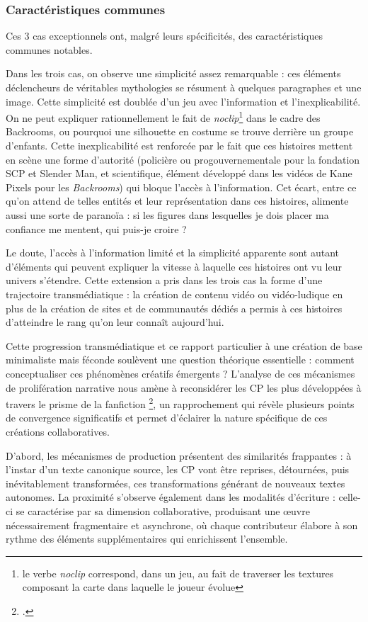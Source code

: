 \documentclass[12pt,a4paper,oneside,titlepage]{book} %
\begin{document}
\subsubsection{Caractéristiques communes}
 Ces 3 cas exceptionnels ont, malgré leurs spécificités, des caractéristiques communes notables. 
 
 Dans les trois cas, on observe une simplicité assez remarquable : ces éléments déclencheurs de véritables mythologies se résument à quelques paragraphes et une image. Cette simplicité est doublée d'un jeu avec l'information et l'inexplicabilité. On ne peut expliquer rationnellement le fait de \textit{noclip}\footnote{le verbe \textit{noclip} correspond, dans un jeu, au fait de traverser les textures composant la carte dans laquelle le joueur évolue} dans le cadre des Backrooms, ou pourquoi une silhouette en costume se trouve derrière un groupe d'enfants. 
 Cette inexplicabilité est renforcée par le fait que ces histoires mettent en scène une forme d'autorité (policière ou progouvernementale pour la fondation SCP et Slender Man, et scientifique, élément développé dans les vidéos de Kane Pixels pour les \textit{Backrooms}) qui bloque l'accès à l'information. Cet écart, entre ce qu'on attend de telles entités et leur représentation dans ces histoires, alimente aussi une sorte de paranoïa : si les figures dans lesquelles je dois placer ma confiance me mentent, qui puis-je croire ? 

Le doute, l'accès à l'information limité et la simplicité apparente sont autant d’éléments qui peuvent expliquer la vitesse à laquelle ces histoires ont vu leur univers s'étendre. Cette extension a pris dans les trois cas la forme d'une trajectoire transmédiatique :  la création de contenu vidéo ou vidéo-ludique en plus de la création de sites et de communautés dédiés a permis à ces histoires d'atteindre le rang qu'on leur connaît aujourd'hui.

Cette progression transmédiatique et ce rapport particulier à une création de base minimaliste mais féconde soulèvent une question théorique essentielle : comment conceptualiser ces phénomènes créatifs émergents ? L'analyse de ces mécanismes de prolifération narrative nous amène à reconsidérer les CP les plus développées à travers le prisme de la fanfiction \footcite{goudet_agentivite_2021}, un rapprochement qui révèle plusieurs points de convergence significatifs et permet d'éclairer la nature spécifique de ces créations collaboratives.

D'abord, les mécanismes de production présentent des similarités frappantes : à l'instar d'un texte canonique source, les CP vont être reprises, détournées, puis inévitablement transformées, ces transformations générant de nouveaux textes autonomes. La proximité s'observe également dans les modalités d'écriture : celle-ci se caractérise par sa dimension collaborative, produisant une œuvre nécessairement fragmentaire et asynchrone, où chaque contributeur élabore à son rythme des éléments supplémentaires qui enrichissent l'ensemble.
\end{document}
